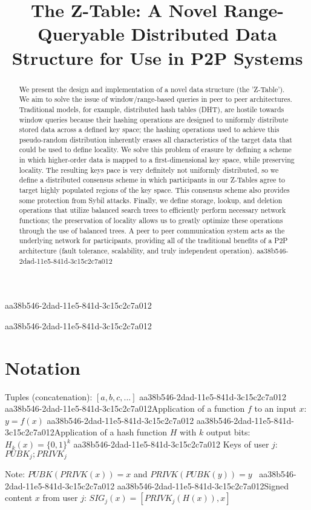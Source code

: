\documentclass[12pt]{article}
\title{The Z-Table: A Novel Range-Queryable Distributed Data Structure for Use in P2P Systems}
\begin{document}
\maketitle
aa38b546-2dad-11e5-841d-3c15c2c7a012
\begin{abstract}
We present the design and implementation of a novel data structure (the 'Z-Table'). We aim to solve the issue of window/range-based queries in peer to peer architectures. Traditional models, for example,  distributed hash tables (DHT), are hostile towards window queries because their hashing operations are designed to uniformly distribute stored data across a defined key space; the hashing operations used to achieve this pseudo-random distribution inherently erases all characteristics of the target data that could be used to define locality. We solve this problem of erasure by defining a scheme in which higher-order data is mapped to a first-dimensional key space, while preserving locality. The resulting keys pace is very definitely not uniformly distributed, so we define a distributed consensus scheme in which participants in our Z-Tables agree to target highly populated regions of the key space. This consensus scheme also provides some protection from Sybil attacks. Finally, we define storage, lookup, and deletion operations that utilize balanced search trees to efficiently perform necessary network functions; the preservation of locality allows us to greatly optimize these operations through the use of balanced trees. A peer to peer communication system acts as the underlying network for participants, providing all of the traditional benefits of a P2P architecture (fault tolerance, scalability, and truly independent operation).
aa38b546-2dad-11e5-841d-3c15c2c7a012\end{abstract}
aa38b546-2dad-11e5-841d-3c15c2c7a012
\section{Notation}

Tuples (concatenation): $[a,b,c,...]$
aa38b546-2dad-11e5-841d-3c15c2c7a012
aa38b546-2dad-11e5-841d-3c15c2c7a012Application of a function $f$ to an input $x$: $y=f(x)$
aa38b546-2dad-11e5-841d-3c15c2c7a012
aa38b546-2dad-11e5-841d-3c15c2c7a012Application of a hash function $H$ with $k$ output bits: $H_{k}(x) = \{0,1\}^k$
aa38b546-2dad-11e5-841d-3c15c2c7a012
Keys of user $j$: $ PUBK_j; PRIVK_j $

Note: $PUBK(PRIVK(x)) = x$ and $PRIVK(PUBK(y)) = y$~
aa38b546-2dad-11e5-841d-3c15c2c7a012
aa38b546-2dad-11e5-841d-3c15c2c7a012Signed content $x$ from user $j$: $SIG_j(x) = \left[ PRIVK_j( H(x) ), x \right]$
\end{document}

